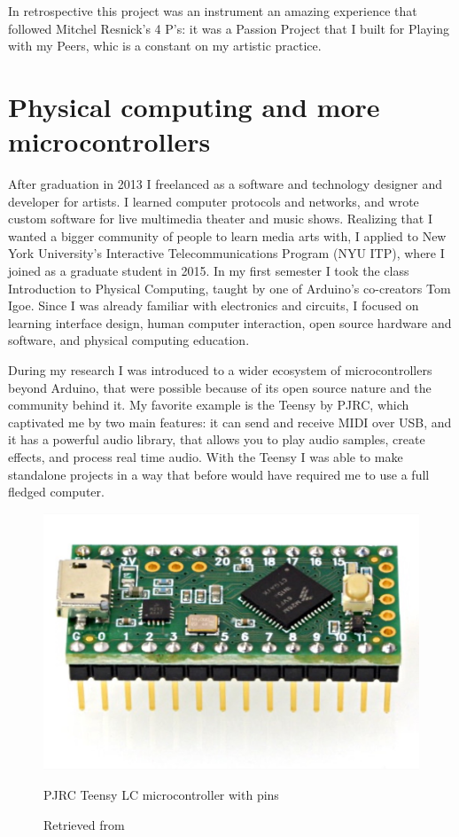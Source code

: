 In retrospective this project was an instrument an amazing experience that followed Mitchel Resnick's 4 P's: it was a Passion Project that I built for Playing with my Peers, whic is a constant on my artistic practice.

\section{Physical computing and more microcontrollers}

After graduation in 2013 I freelanced as a software and technology designer and developer for artists. I learned computer protocols and networks, and wrote custom software for live multimedia theater and music shows. Realizing that I wanted a bigger community of people to learn media arts with, I applied to New York University's Interactive Telecommunications Program (\acrshort{NYU} \acrshort{ITP}), where I joined as a graduate student in 2015. In my first semester I took the class Introduction to Physical Computing, taught by one of Arduino's co-creators Tom Igoe. Since I was already familiar with electronics and circuits, I focused on learning interface design, human computer interaction, open source hardware and software, and physical computing education.

During my research I was introduced to a wider ecosystem of microcontrollers beyond Arduino, that were possible because of its open source nature and the community behind it. My favorite example is the Teensy by PJRC, which captivated me by two main features: it can send and receive \acrshort{MIDI} over USB, and it has a powerful audio library, that allows you to play audio samples, create effects, and process real time audio. With the Teensy I was able to make standalone projects in a way that before would have required me to use a full fledged computer.

\begin{figure}[ht]
  \centering
  \includegraphics[width=0.75\linewidth,height=0.25\textheight,keepaspectratio]{images/pjrc-teensy-lc-with-pins.jpg}
  \caption{PJRC Teensy LC microcontroller with pins}
  \caption*{Retrieved from \cite{website-pjrc-teensy-lc-with-pins}}
  \label{fig:pjrc-teensy-lc-with-pins}
\end{figure}

